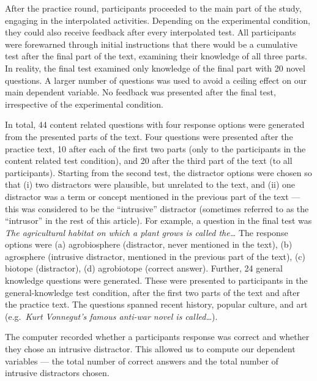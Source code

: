 After the practice round, participants proceeded to the 
main part of the study, engaging in the interpolated 
activities. Depending on the experimental condition, they 
could also receive feedback after every interpolated test. 
All participants were forewarned through initial 
instructions that there would be a cumulative test after 
the final part of the text, examining their knowledge of 
all three parts. In reality, the final test examined only 
knowledge of the final part with 20 novel questions. A 
larger number of questions was used to avoid a ceiling 
effect on our main dependent variable. No feedback was 
presented after the final test, irrespective of the 
experimental condition.

In total, 44 content related questions with four response 
options were generated from the presented parts of the 
text. Four questions were presented after the practice 
text, 10 after each of the first two parts (only to the 
participants in the content related test condition), and 20 
after the third part of the text (to all participants). 
Starting from the second test, the distractor options were 
chosen so that (i) two distractors were plausible, 
but unrelated to the text, and (ii) one distractor was a 
term or concept mentioned in the previous part of the text 
--- this was considered to be the ``intrusive'' distractor 
(sometimes referred to as the ``intrusor'' in the rest of 
this article). For example, a question in the final test
was \textit{The agricultural habitat on which a plant grows 
is called the\ldots} The response options were (a) 
agrobiosphere (distractor, never 
mentioned in the text), (b) agrosphere (intrusive distractor, mentioned in 
the previous part of the text), (c) biotope (distractor), 
(d) agrobiotope (correct answer). Further, 24 general 
knowledge questions were generated. These were presented to 
participants in the general-knowledge test 
condition, after the first two parts of the text and after 
the practice text. The questions spanned recent history, 
popular culture, and art (e.g.~\textit{Kurt Vonnegut's 
famous anti-war novel is called\ldots}).

The computer recorded whether a participants response was 
correct and whether they chose an intrusive distractor. 
This allowed us to compute our dependent variables --- the 
total number of correct answers and the total number of 
intrusive distractors chosen.


